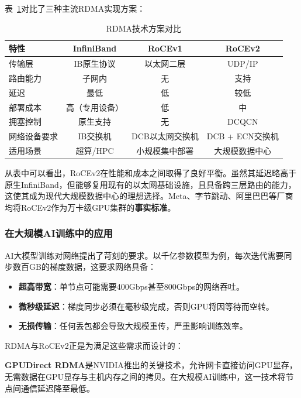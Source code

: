 表~\ref{tab:rdma_comparison}对比了三种主流RDMA实现方案：

\begin{table}[htbp]
\centering
\caption{RDMA技术方案对比}
\label{tab:rdma_comparison}
\begin{tabular}{|l|c|c|c|}
\hline
\textbf{特性} & \textbf{InfiniBand} & \textbf{RoCEv1} & \textbf{RoCEv2} \\
\hline
传输层 & IB原生协议 & 以太网二层 & UDP/IP \\
\hline
路由能力 & 子网内 & 无 & 支持 \\
\hline
延迟 & 最低 & 低 & 较低 \\
\hline
部署成本 & 高（专用设备） & 低 & 中 \\
\hline
拥塞控制 & 原生支持 & 无 & DCQCN \\
\hline
网络设备要求 & IB交换机 & DCB以太网交换机 & DCB + ECN交换机 \\
\hline
适用场景 & 超算/HPC & 小规模集中部署 & 大规模数据中心 \\
\hline
\end{tabular}
\end{table}

从表中可以看出，RoCEv2在性能和成本之间取得了良好平衡。虽然其延迟略高于原生InfiniBand，但能够复用现有的以太网基础设施，且具备跨三层路由的能力，这使其成为现代大规模数据中心的理想选择。Meta、字节跳动、阿里巴巴等厂商均将RoCEv2作为万卡级GPU集群的\textbf{事实标准}。

\subsubsection{在大规模AI训练中的应用}

AI大模型训练对网络提出了苛刻的要求。以千亿参数模型为例，每次迭代需要同步数百GB的梯度数据，这要求网络具备：

\begin{itemize}
    \item \textbf{超高带宽}：单节点可能需要400Gbps甚至800Gbps的网络吞吐。
    \item \textbf{微秒级延迟}：梯度同步必须在毫秒级完成，否则GPU将因等待而空转。
    \item \textbf{无损传输}：任何丢包都会导致大规模重传，严重影响训练效率。
\end{itemize}

RDMA与RoCEv2正是为满足这些需求而设计的：

\textbf{GPUDirect RDMA}是NVIDIA推出的关键技术，允许网卡直接访问GPU显存，无需数据在GPU显存与主机内存之间的拷贝。在大规模AI训练中，这一技术将节点间通信延迟降至最低。

